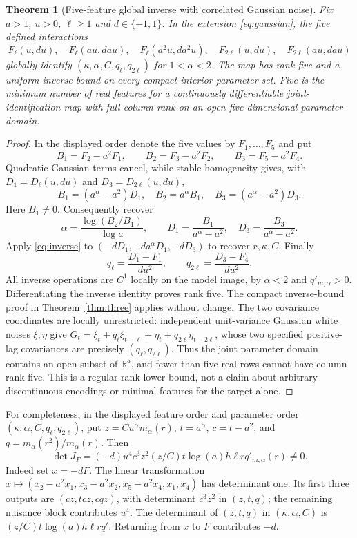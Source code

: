\documentclass[11pt,a4paper]{article}
\newtheorem{theorem}{Theorem}[section]
\theoremstyle{remark}\newtheorem{remark}[theorem]{Remark}
\newcommand{\R}{\mathbb R}\newcommand{\norm}[1]{\left\lVert#1\right\rVert}
\begin{document}
\begin{theorem}[Five-feature global inverse with correlated Gaussian noise]\label{thm:five}
Fix $a>1$, $u>0$, $\ell\ge1$ and $d\in\{-1,1\}$. In the extension \eqref{eq:gaussian}, the five defined interactions
\[
F_\ell(u,du),\quad F_\ell(au,dau),\quad F_\ell(a^2u,da^2u),\quad
F_{2\ell}(u,du),\quad F_{2\ell}(au,dau)
\]
globally identify $(\kappa,\alpha,C,q_\ell,q_{2\ell})$ for $1<\alpha<2$.
The map has rank five and a uniform inverse bound on every compact interior parameter set. Five is the minimum number of real features for a continuously differentiable joint-identification map with full column rank on an open five-dimensional parameter domain.
\end{theorem}
\begin{proof}
In the displayed order denote the five values by $F_1,\ldots,F_5$ and put
\[
B_1=F_2-a^2F_1,\qquad B_2=F_3-a^2F_2,\qquad B_3=F_5-a^2F_4.
\]
Quadratic Gaussian terms cancel, while stable homogeneity gives, with $D_1=D_\ell(u,du)$ and $D_3=D_{2\ell}(u,du)$,
\[
B_1=(a^\alpha-a^2)D_1,\quad B_2=a^\alpha B_1,\quad B_3=(a^\alpha-a^2)D_3.
\]
Here $B_1\ne0$. Consequently recover
\[
\alpha=\frac{\log(B_2/B_1)}{\log a},\qquad
D_1=\frac{B_1}{a^\alpha-a^2},\quad D_3=\frac{B_3}{a^\alpha-a^2}.
\]
Apply \eqref{eq:inverse} to $(-dD_1,-da^\alpha D_1,-dD_3)$ to recover $r,\kappa,C$. Finally
\[
q_\ell=\frac{D_1-F_1}{d u^2},\qquad q_{2\ell}=\frac{D_3-F_4}{d u^2}.
\]
All inverse operations are $C^1$ locally on the model image, by $\alpha<2$ and $q'_{m,\alpha}>0$. Differentiating the inverse identity proves rank five. The compact inverse-bound proof in Theorem~\ref{thm:three} applies without change.
The two covariance coordinates are locally unrestricted: independent unit-variance Gaussian white noises $\xi,\eta$ give
$G_t=\xi_t+q_\ell\xi_{t-\ell}+\eta_t+q_{2\ell}\eta_{t-2\ell}$,
whose two specified positive-lag covariances are precisely $(q_\ell,q_{2\ell})$. Thus the joint parameter domain contains an open subset of $\R^5$, and fewer than five real rows cannot have column rank five. This is a regular-rank lower bound, not a claim about arbitrary discontinuous encodings or minimal features for the target alone.
\end{proof}


For completeness, in the displayed feature order and parameter order $(\kappa,\alpha,C,q_\ell,q_{2\ell})$, put $z=Cu^\alpha m_\alpha(r)$, $t=a^\alpha$, $c=t-a^2$, and $q=m_\alpha(r^2)/m_\alpha(r)$. Then
\begin{equation}\label{eq:fivedet}
\det J_F=(-d)u^4c^3z^2(z/C)t\log(a)h\ell r q'_{m,\alpha}(r)\ne0.
\end{equation}
Indeed set $x=-dF$. The linear transformation $x\mapsto(x_2-a^2x_1,x_3-a^2x_2,x_5-a^2x_4,x_1,x_4)$ has determinant one. Its first three outputs are $(cz,tcz,cqz)$, with determinant $c^3z^2$ in $(z,t,q)$; the remaining nuisance block contributes $u^4$. The determinant of $(z,t,q)$ in $(\kappa,\alpha,C)$ is $(z/C)t\log(a)h\ell r q'$. Returning from $x$ to $F$ contributes $-d$.
\end{document}
